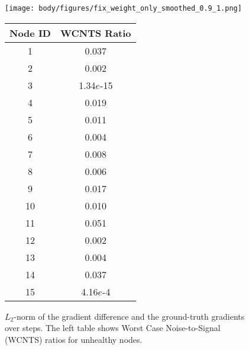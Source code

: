 
\begin{figure*}[ht]
    \centering
    \vskip -0.12in
    \begin{minipage}[c]{0.69\linewidth}
        \centering
        \texttt{[image: body/figures/fix\_weight\_only\_smoothed\_0.9\_1.png]}
    \end{minipage}
    \hfill
    \begin{minipage}[c]{0.3\linewidth} %
        \centering
        \vskip 0.2in
        \begin{tiny}
            \begin{sc}
                \begin{tabular}{cc} %
                    \toprule
                    Node ID & WCNTS Ratio \\
                    \midrule
                    1 & 0.037 \\
                    2 & 0.002 \\
                    3 & 1.34$e$-15 \\
                    4 & 0.019 \\
                    5 & 0.011 \\
                    6 & 0.004 \\
                    7 & 0.008 \\
                    8 & 0.006 \\
                    9 & 0.017 \\
                    10 & 0.010 \\
                    11 & 0.051 \\
                    12 & 0.002 \\
                    13 & 0.004 \\
                    14 & 0.037 \\
                    15 & 4.16$e$-4 \\
                    \bottomrule
                \end{tabular}
            \end{sc}
        \end{tiny}

    \end{minipage}
    \vskip -0.1in
    \caption{$L_2$-norm of the gradient difference and the ground-truth gradients over steps. The left table shows Worst Case Noise-to-Signal (WCNTS) ratios for unhealthy nodes.}
    \label{fig:fix_weight_only}
    \vskip -0.1in
\end{figure*}

